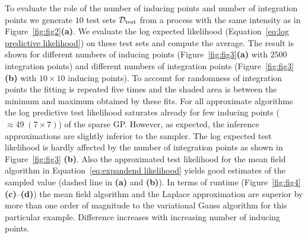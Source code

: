 \documentclass[twoside,11pt]{article}
\newcommand{\dataset}{{\cal D}}
\begin{document}
To evaluate the role of the number of inducing points and number of integration points we generate $10$ test sets $\dataset_{\rm test}$ from a process with the same intensity as in Figure~\ref{fig:fig2}{\bf (a)}. We evaluate the log expected likelihood (Equation~\eqref{eq:log predictive likelihood}) on these test sets and compute the average. The result is shown for different numbers of inducing points (Figure~\ref{fig:fig3}{\bf (a)} with $2500$ integration points) and different numbers of integration points (Figure~\ref{fig:fig3}{\bf (b)} with $10\times10$ inducing points). To account for randomness of integration points the fitting is repeated five times and the shaded area is between the minimum and maximum obtained by these fits. For all approximate algorithms the log predictive test likelihood saturates already for few inducing points ($\approx49\; (7\times 7)$) of the sparse GP. However, as expected, the inference approximations are slightly inferior to the sampler. The log expected test likelihood is hardly affected by the number of integration points as shown in Figure~\ref{fig:fig3} {\bf (b)}. Also the approximated test likelihood for the mean field algorithm in Equation~\eqref{eq:expandend likelihood} yields good estimates of the sampled value (dashed line in {\bf (a)} and {\bf (b)}).
In terms of runtime (Figure~\ref{fig:fig4} {\bf (c)}--{\bf (d)}) the mean field algorithm and the Laplace approximation are superior by more than one order of magnitude to the variational Gauss algorithm for this particular example. Difference increases with increasing number of inducing points.
\end{document}
